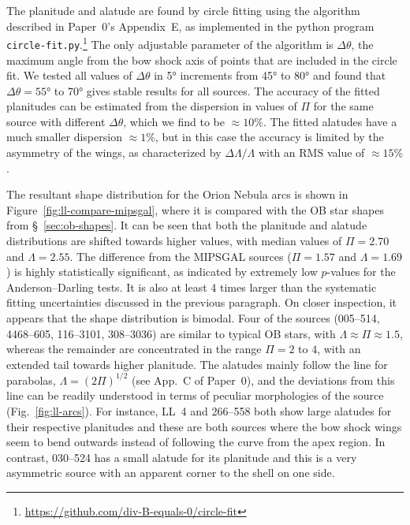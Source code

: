 The planitude and alatude are found by circle fitting using the
algorithm described in Paper~0's Appendix~E, as implemented in the
python program
\texttt{circle-fit.py}.\footnote{\url{https://github.com/div-B-equals-0/circle-fit}}
The only adjustable parameter of the algorithm is \(\Delta\theta\), the maximum
angle from the bow shock axis of points that are included in the
circle fit.  We tested all values of \(\Delta\theta\) in \ang{5} increments from
\ang{45} to \ang{80} and found that \(\Delta\theta = \ang{55}\) to \ang{70}
gives stable results for all sources.  The accuracy of the fitted
planitudes can be estimated from the dispersion in values of \(\Pi\) for
the same source with different \(\Delta\theta\), which we find to be
\(\approx 10\%\).  The fitted alatudes have a much smaller dispersion
\(\approx 1 \%\), but in this case the accuracy is limited by the asymmetry
of the wings, as characterized by \(\Delta\Lambda/\Lambda\) with an RMS value of
\(\approx 15\%\).

The resultant shape distribution for the Orion Nebula arcs is shown in
Figure~\ref{fig:ll-compare-mipsgal}, where it is compared with the OB
star shapes from \S~\ref{sec:ob-shapes}.  It can be seen that both the
planitude and alatude distributions are shifted towards higher values,
with median values of \(\Pi = 2.70\) and \(\Lambda = 2.55\).  The difference
from the MIPSGAL sources (\(\Pi = 1.57\) and \(\Lambda = 1.69\)) is highly
statistically significant, as indicated by extremely low \(p\)-values
for the Anderson--Darling tests.  It is also at least 4 times larger
than the systematic fitting uncertainties discussed in the previous
paragraph.  On closer inspection, it appears that the shape
distribution is bimodal.  Four of the sources (005--514, 4468--605,
116--3101, 308--3036) are similar to typical OB stars, with
\(\Lambda \approx \Pi \approx 1.5\), whereas the remainder are concentrated in the range
\(\Pi = 2\) to \(4\), with an extended tail towards higher planitude.
The alatudes mainly follow the line for parabolas,
\(\Lambda = (2\Pi)^{1/2}\) (see App.~C of Paper~0), and the deviations from
this line can be readily understood in terms of peculiar morphologies
of the source (Fig.~\ref{fig:ll-arcs}).  For instance, LL~4 and
266--558 both show large alatudes for their respective planitudes and
these are both sources where the bow shock wings seem to bend outwards
instead of following the curve from the apex region.  In contrast,
030--524 has a small alatude for its planitude and this is a very
asymmetric source with an apparent corner to the shell on one side.



